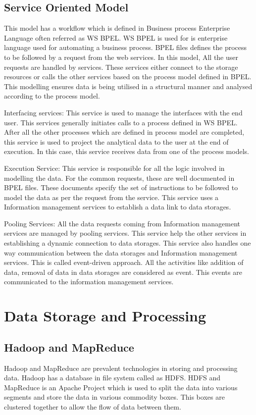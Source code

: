 \documentclass[sigconf]{acmart}
\begin{document}
\subsection{Service Oriented Model}

 This model has a workflow which is defined in Business process Enterprise Language often referred as WS BPEL\cite{WSBPEL}. WS BPEL is used for is enterprise language used for automating a business process. BPEL files defines the process to be followed by a request from the web services. In this model, All the user requests are handled by services. These services either connect to the storage resources or calls the other services based on the process model defined in BPEL. This modelling ensures data is being utilised in a structural manner and analysed according to the process model.

Interfacing services: 
This service is used to manage the interfaces with the end user. This services generally initiates calls to a process defined in WS BPEL. After all the other processes which are defined in process model are completed, this service is used to project the analytical data to the user at the end of execution. In this case, this service receives data from one of the process models.\cite{Pathak}

Execution Service:
This service is responsible for all the logic involved in modelling the data. For the common requests, these are well documented in BPEL files. These documents specify the set of instructions to be followed to model the data as per the request from the service. This service uses a Information management services to establish a data link to data storages.\cite{Pathak}

Pooling Services:
All the data requests coming from Information management services are  managed by pooling services. This service help the other services in establishing a dynamic connection to data storages. This service also handles one way communication between the data storages and Information management services. This is called event-driven approach. All the activities like addition of data, removal of data  in data storages are considered as event. This events are communicated to the information management services. 

\section{Data Storage and Processing}
\subsection{Hadoop and MapReduce}
Hadoop and MapReduce are prevalent technologies in storing and processing data. Hadoop has a database in file system called as HDFS. HDFS\cite{hadoop} and MapReduce is an Apache Project which is used to split the data into various segments and store the data in various commodity boxes. This boxes are clustered together to allow the flow of data between them.
\end{document}
